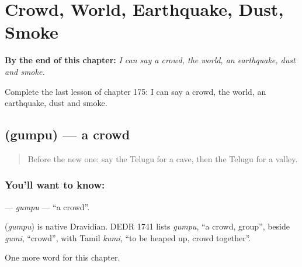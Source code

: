 
\chapter{Crowd, World, Earthquake, Dust, Smoke}
\label{ch:te-crowd-world-earthquake-dust-smoke}

\begin{chapteropening}
\textbf{By the end of this chapter:} \emph{I can say a crowd, the world, an earthquake, dust and smoke.}

Complete the last lesson of chapter 175: I can say a crowd, the world, an earthquake, dust and smoke.
\end{chapteropening}

\section[\texorpdfstring{\te{గుంపు} (gumpu)}{గుంపు (gumpu)}]{ (gumpu) — a crowd}

\label{lesson:TE-C175-gumpu}



\begin{quote}
Before the new one: say the Telugu for a cave, then the Telugu for a valley.
\end{quote}

\subsection*{You'll want to know: }
\textbf{} — \emph{gumpu} — \textquotedblleft{}a crowd\textquotedblright{}.

\begin{cousinweb}
\textbf{} (\emph{gumpu}) is native Dravidian. DEDR 1741 lists \emph{gumpu}, \textquotedblleft{}a crowd, group\textquotedblright{}, beside \emph{gumi}, \textquotedblleft{}crowd\textquotedblright{}, with Tamil \emph{kumi}, \textquotedblleft{}to be heaped up, crowd together\textquotedblright{}.
\end{cousinweb}

\begin{grammarlens}[title={What you've built}]
One more word for this chapter.
\end{grammarlens}

